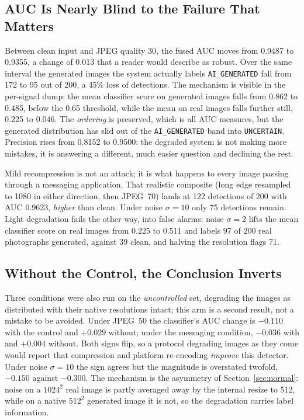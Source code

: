 \documentclass[conference]{IEEEtran}
\begin{document}
\subsection{AUC Is Nearly Blind to the Failure That Matters}

Between clean input and JPEG quality 30, the fused AUC moves from 0.9487 to
0.9355, a change of 0.013 that a reader would describe as robust. Over the same
interval the generated images the system actually labels
\texttt{AI\_GENERATED} fall from 172 to 95 out of 200, a 45\% loss of
detections. The mechanism is visible in the per-signal dump: the mean
classifier score on generated images falls from 0.862 to 0.485, below the 0.65
threshold, while the mean on real images falls further still, 0.225 to 0.046.
The \emph{ordering} is preserved, which is all AUC measures, but the generated
distribution has slid out of the \texttt{AI\_GENERATED} band into
\texttt{UNCERTAIN}. Precision rises from 0.8152 to 0.9500: the degraded system
is not making more mistakes, it is answering a different, much easier question
and declining the rest.

Mild recompression is not an attack; it is what happens to every image
passing through a messaging application. That realistic composite (long edge resampled
to 1080 in either direction, then JPEG~70) lands at 122 detections of 200 with
AUC 0.9623, \emph{higher} than clean. Under noise $\sigma{=}10$ only 75
detections remain. Light degradation fails the other way, into false alarms:
noise $\sigma{=}2$ lifts the mean classifier score on real images from 0.225 to
0.511 and labels 97 of 200 real photographs generated, against 39 clean, and
halving the resolution flags 71.

\subsection{Without the Control, the Conclusion Inverts}

Three conditions were also run on the \emph{uncontrolled} set, degrading the
images as distributed with their native resolutions intact; this arm is a
second result, not a mistake to be avoided. Under JPEG~50 the classifier's AUC
change is $-0.110$ with the control and $+0.029$ without; under the messaging
condition, $-0.036$ with and $+0.004$ without. Both signs flip, so a protocol
degrading images as they come would report that compression and platform
re-encoding \emph{improve} this detector. Under noise $\sigma{=}10$ the sign
agrees but the magnitude is overstated twofold, $-0.150$ against $-0.300$. The
mechanism is the asymmetry of Section~\ref{sec:normal}: noise on a $1024^2$
real image is partly averaged away by the internal resize to 512, while on a
native $512^2$ generated image it is not, so the degradation carries label
information.
\end{document}
